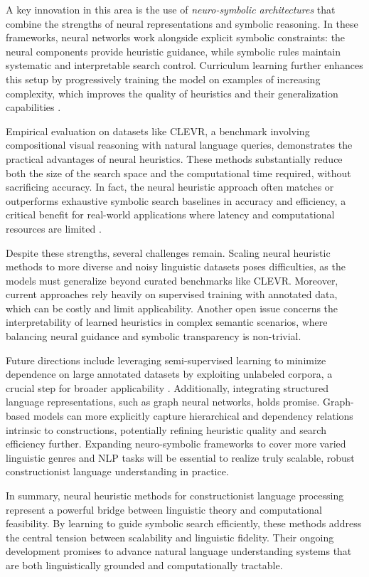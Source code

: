 \documentclass[sigconf]{acmart}
\begin{document}
A key innovation in this area is the use of \emph{neuro-symbolic architectures} that combine the strengths of neural representations and symbolic reasoning. In these frameworks, neural networks work alongside explicit symbolic constraints: the neural components provide heuristic guidance, while symbolic rules maintain systematic and interpretable search control. Curriculum learning further enhances this setup by progressively training the model on examples of increasing complexity, which improves the quality of heuristics and their generalization capabilities \cite{ref40}.

Empirical evaluation on datasets like CLEVR, a benchmark involving compositional visual reasoning with natural language queries, demonstrates the practical advantages of neural heuristics. These methods substantially reduce both the size of the search space and the computational time required, without sacrificing accuracy. In fact, the neural heuristic approach often matches or outperforms exhaustive symbolic search baselines in accuracy and efficiency, a critical benefit for real-world applications where latency and computational resources are limited \cite{ref40}.

Despite these strengths, several challenges remain. Scaling neural heuristic methods to more diverse and noisy linguistic datasets poses difficulties, as the models must generalize beyond curated benchmarks like CLEVR. Moreover, current approaches rely heavily on supervised training with annotated data, which can be costly and limit applicability. Another open issue concerns the interpretability of learned heuristics in complex semantic scenarios, where balancing neural guidance and symbolic transparency is non-trivial.

Future directions include leveraging semi-supervised learning to minimize dependence on large annotated datasets by exploiting unlabeled corpora, a crucial step for broader applicability \cite{ref40}. Additionally, integrating structured language representations, such as graph neural networks, holds promise. Graph-based models can more explicitly capture hierarchical and dependency relations intrinsic to constructions, potentially refining heuristic quality and search efficiency further. Expanding neuro-symbolic frameworks to cover more varied linguistic genres and NLP tasks will be essential to realize truly scalable, robust constructionist language understanding in practice.

In summary, neural heuristic methods for constructionist language processing represent a powerful bridge between linguistic theory and computational feasibility. By learning to guide symbolic search efficiently, these methods address the central tension between scalability and linguistic fidelity. Their ongoing development promises to advance natural language understanding systems that are both linguistically grounded and computationally tractable.
\end{document}
